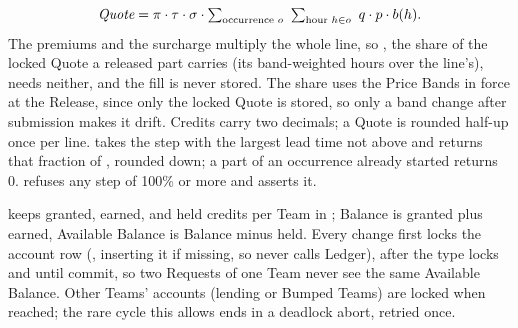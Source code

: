 \[ \textit{Quote} = \pi \cdot \tau \cdot \sigma \cdot \textstyle\sum_{\mbox{\scriptsize occurrence } o}\ \sum_{\mbox{\scriptsize hour } h \in o}\ q \cdot p \cdot b(h). \]
The premiums and the surcharge multiply the whole line, so , the share of the locked Quote a released part carries (its band-weighted hours over the line's), needs neither, and the fill is never stored. The share uses the Price Bands in force at the Release, since only the locked Quote is stored, so only a band change after submission makes it drift. Credits carry two decimals; a Quote is rounded half-up once per line.  takes the step with the largest lead time not above  and returns that fraction of , rounded down; a part of an occurrence already started returns 0.  refuses any step of 100\% or more and  asserts it.

 keeps granted, earned, and held credits per Team in ; Balance is granted plus earned, Available Balance is Balance minus held. Every change first locks the account row (, inserting it if missing, so  never calls Ledger), after the type locks and until commit, so two Requests of one Team never see the same Available Balance. Other Teams' accounts (lending or Bumped Teams) are locked when reached; the rare cycle this allows ends in a deadlock abort, retried once.


